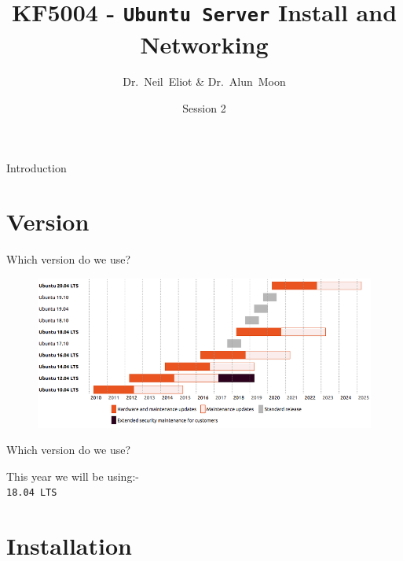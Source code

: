\documentclass[aspectratio=169]{beamer}
\title{KF5004 - \texttt{Ubuntu Server} Install and Networking}
\author{Dr.~Neil~Eliot \& Dr.~Alun~Moon}
\institute[Northumbria University] %
{
  Department of Computer and Information Sciences\\
  University of Northumbria
}
\date{Session 2}
\begin{document}
\begin{frame}
  \titlepage
\end{frame}

\begin{frame}{Introduction}
  \tableofcontents
\end{frame}

\section{Version}
\begin{frame}{Which version do we use?}
  \begin{figure}
    \begin{center}
      \includegraphics[width=0.8\linewidth]{Version.png}
    \end{center}
  \end{figure}
\end{frame}

\begin{frame}{Which version do we use?}
  \begin{center}
    \LARGE This year we will be using:-\\
    \Huge \texttt{18.04 LTS}
  \end{center}
\end{frame}

\section{Installation}
\end{document}
